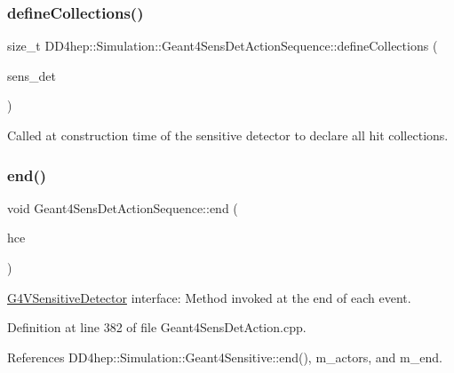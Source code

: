 \subsubsection{\texorpdfstring{define\+Collections()}{defineCollections()}}
{\footnotesize\ttfamily size\+\_\+t D\+D4hep\+::\+Simulation\+::\+Geant4\+Sens\+Det\+Action\+Sequence\+::define\+Collections (\begin{DoxyParamCaption}\item[{\hyperlink{class_d_d4hep_1_1_simulation_1_1_geant4_action_s_d}{Geant4\+Action\+SD} $\ast$}]{sens\+\_\+det }\end{DoxyParamCaption})}



Called at construction time of the sensitive detector to declare all hit collections. 

\hypertarget{class_d_d4hep_1_1_simulation_1_1_geant4_sens_det_action_sequence_a2b7944c785413b2a479f4ba4ad2e1515}{}\label{class_d_d4hep_1_1_simulation_1_1_geant4_sens_det_action_sequence_a2b7944c785413b2a479f4ba4ad2e1515} 
\subsubsection{\texorpdfstring{end()}{end()}}
{\footnotesize\ttfamily void Geant4\+Sens\+Det\+Action\+Sequence\+::end (\begin{DoxyParamCaption}\item[{G4\+H\+Cof\+This\+Event $\ast$}]{hce }\end{DoxyParamCaption})\hspace{0.3cm}{\ttfamily [virtual]}}



\hyperlink{class_g4_v_sensitive_detector}{G4\+V\+Sensitive\+Detector} interface\+: Method invoked at the end of each event. 



Definition at line 382 of file Geant4\+Sens\+Det\+Action.\+cpp.



References D\+D4hep\+::\+Simulation\+::\+Geant4\+Sensitive\+::end(), m\+\_\+actors, and m\+\_\+end.

\hypertarget{class_d_d4hep_1_1_simulation_1_1_geant4_sens_det_action_sequence_adf93b5f5979f9d289aa09f0909a5bd7d}{}\label{class_d_d4hep_1_1_simulation_1_1_geant4_sens_det_action_sequence_adf93b5f5979f9d289aa09f0909a5bd7d} 
